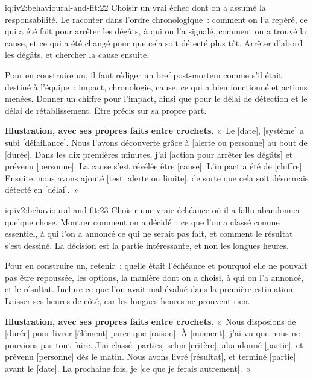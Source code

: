\begin{solution}{iq:iv2:behavioural-and-fit:22}
Choisir un vrai échec dont on a assumé la responsabilité. Le raconter dans l'ordre chronologique~: comment on l'a repéré, ce qui a été fait pour arrêter les dégâts, à qui on l'a signalé, comment on a trouvé la cause, et ce qui a été changé pour que cela soit détecté plus tôt. Arrêter d'abord les dégâts, et chercher la cause ensuite.

Pour en construire un, il faut rédiger un bref post-mortem comme s'il était destiné à l'équipe~: impact, chronologie, cause, ce qui a bien fonctionné et actions menées. Donner un chiffre pour l'impact, ainsi que pour le délai de détection et le délai de rétablissement. Être précis sur sa propre part.

\textbf{Illustration, avec ses propres faits entre crochets.} «~Le [date], [système] a subi [défaillance]. Nous l'avons découverte grâce à [alerte ou personne] au bout de [durée]. Dans les dix premières minutes, j'ai [action pour arrêter les dégâts] et prévenu [personne]. La cause s'est révélée être [cause]. L'impact a été de [chiffre]. Ensuite, nous avons ajouté [test, alerte ou limite], de sorte que cela soit désormais détecté en [délai].~»

\end{solution}

\begin{solution}{iq:iv2:behavioural-and-fit:23}
Choisir une vraie échéance où il a fallu abandonner quelque chose. Montrer comment on a décidé~: ce que l'on a classé comme essentiel, à qui l'on a annoncé ce qui ne serait pas fait, et comment le résultat s'est dessiné. La décision est la partie intéressante, et non les longues heures.

Pour en construire un, retenir~: quelle était l'échéance et pourquoi elle ne pouvait pas être repoussée, les options, la manière dont on a choisi, à qui on l'a annoncé, et le résultat. Inclure ce que l'on avait mal évalué dans la première estimation. Laisser ses heures de côté, car les longues heures ne prouvent rien.

\textbf{Illustration, avec ses propres faits entre crochets.} «~Nous disposions de [durée] pour livrer [élément] parce que [raison]. À [moment], j'ai vu que nous ne pouvions pas tout faire. J'ai classé [parties] selon [critère], abandonné [partie], et prévenu [personne] dès le matin. Nous avons livré [résultat], et terminé [partie] avant le [date]. La prochaine fois, je [ce que je ferais autrement].~»

\end{solution}

